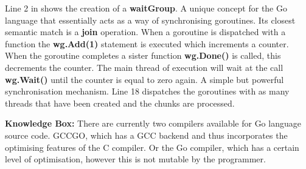 \documentclass[11pt]{article} %
\begin{document}
Line 2 in shows the creation of a {\bf waitGroup}. A unique concept for the Go language that essentially acts as a way of synchronising goroutines. Its closest semantic match is a {\bf join} operation. When a goroutine is dispatched with a function the {\bf wg.Add(1)} statement is executed which increments a counter. When the goroutine completes a sister function {\bf wg.Done()} is called, this decrements the counter. The main thread of execution will wait at the call {\bf wg.Wait()} until the counter is equal to zero again. A simple but powerful synchronisation mechanism. Line 18 dispatches the goroutines with as many threads that have been created and the chunks are processed.
\smallskip
\begin{mdframed}
{\bf Knowledge Box:} There are currently two compilers available for Go language source code. GCCGO, which has a GCC backend and thus incorporates the optimising features of the C compiler. Or the Go compiler, which has a certain level of optimisation, however this is not mutable by the programmer.
\end{mdframed}
\end{document}
